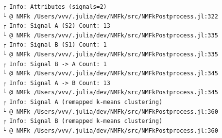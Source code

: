 \documentclass[11pt]{article}
\begin{document}
    \begin{Verbatim}[commandchars=\\\{\}]
┌ Info: Attributes (signals=2)
└ @ NMFk /Users/vvv/.julia/dev/NMFk/src/NMFkPostprocess.jl:322
┌ Info: Signal A (S2) Count: 13
└ @ NMFk /Users/vvv/.julia/dev/NMFk/src/NMFkPostprocess.jl:335
┌ Info: Signal B (S1) Count: 1
└ @ NMFk /Users/vvv/.julia/dev/NMFk/src/NMFkPostprocess.jl:335
┌ Info: Signal B -> A Count: 1
└ @ NMFk /Users/vvv/.julia/dev/NMFk/src/NMFkPostprocess.jl:345
┌ Info: Signal A -> B Count: 13
└ @ NMFk /Users/vvv/.julia/dev/NMFk/src/NMFkPostprocess.jl:345
┌ Info: Signal A (remapped k-means clustering)
└ @ NMFk /Users/vvv/.julia/dev/NMFk/src/NMFkPostprocess.jl:360
┌ Info: Signal B (remapped k-means clustering)
└ @ NMFk /Users/vvv/.julia/dev/NMFk/src/NMFkPostprocess.jl:360
    \end{Verbatim}

    \begin{center}
    \end{center}
    { \hspace*{\fill} \\}
    
    \begin{Verbatim}[commandchars=\\\{\}]

    \end{Verbatim}

    \begin{center}
    \end{center}
    { \hspace*{\fill} \\}
    
    \begin{center}
    \end{center}
    { \hspace*{\fill} \\}
    
    \begin{Verbatim}[commandchars=\\\{\}]

    \end{Verbatim}

    \begin{center}
    \end{center}
    { \hspace*{\fill} \\}
    
\end{document}
